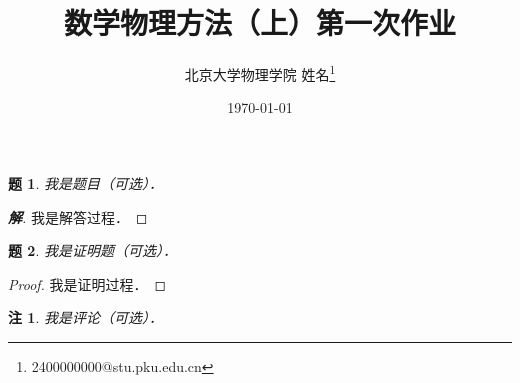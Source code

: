\documentclass[11pt, a4paper]{ctexart}
\title{\textbf{数学物理方法（上）第一次作业}}	%
\author{北京大学物理学院 \quad 2400000000 \quad 姓名\thanks{2400000000@stu.pku.edu.cn}}
\date{\today}
\newtheorem{problem}{\indent 题}
\newenvironment{solution}{\begin{proof}[\indent \textbf{\emph{解}}]}{\end{proof}}
\newtheorem*{remark}{\indent 注}
\begin{document}
\maketitle
\thispagestyle{fancy}	%

\begin{problem}
	我是题目（可选）．
\end{problem}

\begin{solution}
	我是解答过程．
\end{solution}

\begin{problem}
	我是证明题（可选）．
\end{problem}

\begin{proof}
	我是证明过程．
\end{proof}

\begin{remark}
	我是评论（可选）．
\end{remark}


\end{document}
